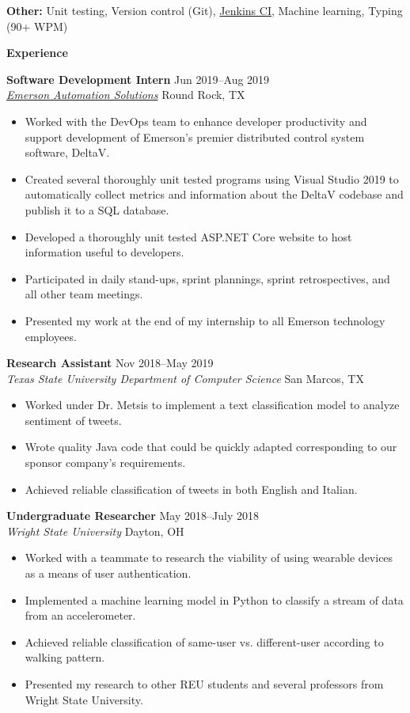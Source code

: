 \documentclass[10pt]{article}
\newlength{\headingborderwidth}
\newcommand{\resheading}[1]{
    \begin{mdframed}[
        backgroundcolor=black!15,
        linewidth=\headingborderwidth,
        innertopmargin=4pt,
        innerbottommargin=4pt,
        skipabove=6pt,
        skipbelow=2pt]
        \textbf{\large #1}
    \end{mdframed}
}
\newcommand{\ressubheading}[4]{
    \textbf{#1} \hfill #2 \\[0pt]
    \textit{#3} \hfill #4 \\[0pt]
}
\newenvironment{resitemize}{
    \vspace{-6pt}
    \begin{itemize}
    \setlength\itemsep{-2pt}
}{
    \end{itemize}
}
\begin{document}
\begin{NoHyper}
\textbf{Other:}
    Unit testing,
    Version control (Git),
    \href{https://jenkins.io/}{Jenkins CI},
    Machine learning,
    Typing (90+ WPM)

%
%

\resheading{Experience}

\ressubheading
	{Software Development Intern}
	{Jun 2019--Aug 2019}
	{\href{https://www.emerson.com/en-us/automation-solutions}{Emerson Automation Solutions}}
	{Round Rock, TX}
    \begin{resitemize}
        \item Worked with the DevOps team to enhance developer productivity and support development of Emerson's premier distributed control system software, DeltaV.
        \item Created several thoroughly unit tested programs using Visual Studio 2019 to automatically collect metrics and information about the DeltaV codebase and publish it to a SQL database.
        \item Developed a thoroughly unit tested ASP.NET Core website to host information useful to developers.
        \item Participated in daily stand-ups, sprint plannings, sprint retrospectives, and all other team meetings.
        \item Presented my work at the end of my internship to all Emerson technology  employees.
    \end{resitemize}

\ressubheading
	{Research Assistant}
	{Nov 2018--May 2019}
	{Texas State University Department of Computer Science}
	{San Marcos, TX}
    \begin{resitemize}
    	\item Worked under Dr. Metsis to implement a text classification model to analyze sentiment of tweets.
    	\item Wrote quality Java code that could be quickly adapted corresponding to our sponsor company's requirements.
        \item Achieved reliable classification of tweets in both English and Italian.
    \end{resitemize}

\ressubheading
	{Undergraduate Researcher}
	{May 2018--July 2018}
	{Wright State University}
	{Dayton, OH}
    \begin{resitemize}
        \item Worked with a teammate to research the viability of using wearable devices as a means of user authentication.
        \item Implemented a machine learning model in Python to classify a stream of data from an accelerometer.
        \item Achieved reliable classification of same-user vs. different-user according to walking pattern.
        \item Presented my research to other REU students and several professors from Wright State University.
    \end{resitemize}


\end{NoHyper}
\end{document}
